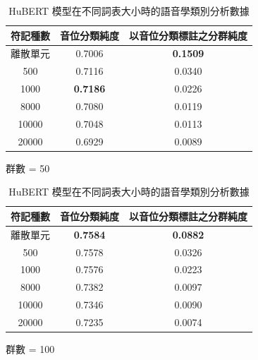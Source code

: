 \begin{table}[!htbp]
    \centering
    
    \begin{subtable}[t]{\textwidth}
        \centering
        \begin{tabular}{|c|c|c|} \hline 
                符記種數& 音位分類純度& 以音位分類標註之分群純度\\ \hline 
               離散單元&   0.7006&  \textbf{0.1509}
\\ \hline 
                   500    &  0.7116&  0.0340
\\ \hline 
                  1000    &  \textbf{0.7186}&  0.0226
\\ \hline 
                  8000    &  0.7080&  0.0119
\\ \hline 
                 10000    &  0.7048&  0.0113
\\ \hline 
                 20000    &  0.6929&  0.0089\\ \hline 
        \end{tabular}
\caption{群數 = 50}
        \label{tab:ch4-new-hubert-pcls-clu050}
    \end{subtable}        

    \vfill        

    \begin{subtable}[t]{\textwidth}
        \centering
        \begin{tabular}{|c|c|c|} \hline 
                符記種數& 音位分類純度& 以音位分類標註之分群純度\\ \hline 
               離散單元&   \textbf{0.7584}&  \textbf{0.0882}\\ \hline 
                   500    &  0.7578&  0.0326
\\ \hline 
                  1000    &  0.7576&  0.0223
\\ \hline 
                  8000    &  0.7382&  0.0097
\\ \hline 
                 10000    &  0.7346&  0.0090
\\ \hline 
                 20000    &  0.7235&  0.0074
\\ \hline 
        \end{tabular}
\caption{群數 = 100}
        \label{tab:ch4-new-hubert-pcls-clu100}
    \end{subtable}    

\caption{HuBERT 模型在不同詞表大小時的語音學類別分析數據}
    \label{tab:new--hubert-pcls-results}
\end{table}

